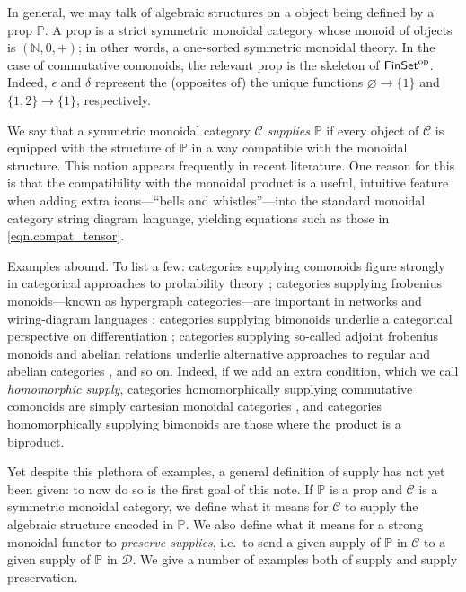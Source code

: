 \documentclass[11pt, oneside, article]{memoir}
\theoremstyle{plain}
\theoremstyle{definition}
\theoremstyle{remark}
\newcommand{\cat}[1]{\mathcal{#1}}%
\newcommand{\Cat}[1]{{\mathsf{#1}}}%
\newcommand{\tn}[1]{\textnormal{#1}}
\newcommand{\op}{^{\tn{op}}}
\newcommand{\finset}{\Cat{FinSet}}
\newcommand{\nn}{\mathbb{N}}
\newcommand{\pp}{\mathbb{P}}
\begin{document}
In general, we may talk of algebraic structures on a object being defined by a prop $\pp$. A prop is a strict symmetric monoidal category whose monoid of objects is $(\nn,0,+)$; in other words, a one-sorted symmetric monoidal theory. In the case of commutative comonoids, the relevant prop is the skeleton of $\finset\op$. Indeed, $\epsilon$ and $\delta$ represent the (opposites of) the unique functions $\varnothing\to\{1\}$ and $\{1,2\}\to\{1\}$, respectively.

We say that a symmetric monoidal category $\cat{C}$ \emph{supplies} $\pp$ if every object of $\cat{C}$ is equipped with the structure of $\pp$ in a way compatible with the monoidal structure. This notion appears frequently in recent literature. One reason for this is that the compatibility with the monoidal product is a useful, intuitive feature when adding extra icons---``bells and whistles''---into the standard monoidal category string diagram language, yielding equations such as those in \cref{eqn.compat_tensor}.

Examples abound. To list a few: categories supplying comonoids figure strongly in categorical approaches to probability theory \cite{fong2012causal,fritz2019}; categories supplying frobenius monoids---known as hypergraph categories---are important in networks and wiring-diagram languages \cite{fong2019hypergraph}; categories supplying bimonoids underlie a categorical perspective on differentiation \cite{blute2009cartesian}; categories supplying so-called adjoint frobenius monoids and abelian relations underlie alternative approaches to regular and abelian categories \cite{fong2019abelian}, and so on. Indeed, if we add an extra condition, which we call \emph{homomorphic supply}, categories homomorphically supplying commutative comonoids are simply cartesian monoidal categories \cite{fox1976coalgebras}, and categories homomorphically supplying bimonoids are those where the product is a biproduct.

Yet despite this plethora of examples, a general definition of supply has not yet been given: to now do so is the first goal of this note. If $\pp$ is a prop and $\cat{C}$ is a symmetric monoidal category, we define what it means for $\cat{C}$ to supply the algebraic structure encoded in $\pp$. We also define what it means for a strong monoidal functor to \emph{preserve supplies}, i.e.\ to send a given supply of $\pp$ in $\cat{C}$ to a given supply of $\pp$ in $\cat{D}$. We give a number of examples both of supply and supply preservation.
\end{document}
